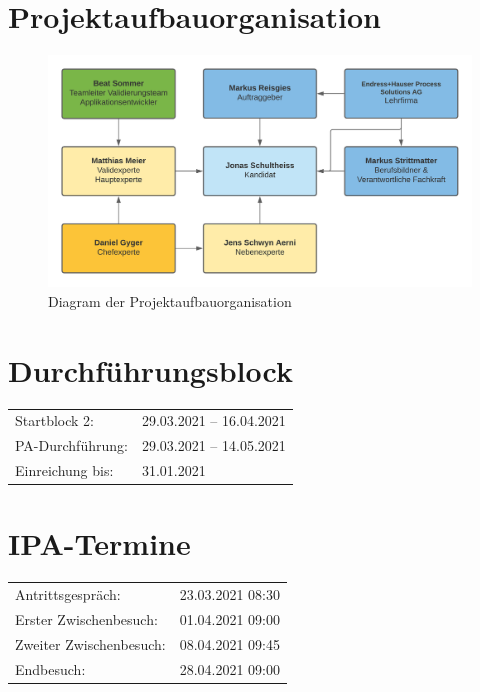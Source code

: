\section{Projektaufbauorganisation}

\begin{figure}[!ht]
  \centering
  \includegraphics[width=.95\linewidth]{./images/Projektaufbauorganisation.png}
  \caption[Diagram der Projektaufbauorganisation]{Diagram der Projektaufbauorganisation}
  \label{fig:projektaufbauorganisation}
\end{figure}
\pagebreak
\section{Durchführungsblock}

\begin{table}[htp]
  \begin{tabularx}{\textwidth}{l X}
    Startblock 2: & 29.03.2021 – 16.04.2021\\
    PA-Durchführung: & 29.03.2021 – 14.05.2021 \\
    Einreichung bis: & 31.01.2021 \\
  \end{tabularx}
\end{table}

\section{IPA-Termine}

\begin{table}[htp]
  \begin{tabularx}{\textwidth}{l X}
    Antrittsgespräch: & 23.03.2021 08:30 \\
    Erster Zwischenbesuch: & 01.04.2021 09:00 \\
    Zweiter Zwischenbesuch: & 08.04.2021 09:45 \\
    Endbesuch: & 28.04.2021 09:00 \\
  \end{tabularx}
\end{table}